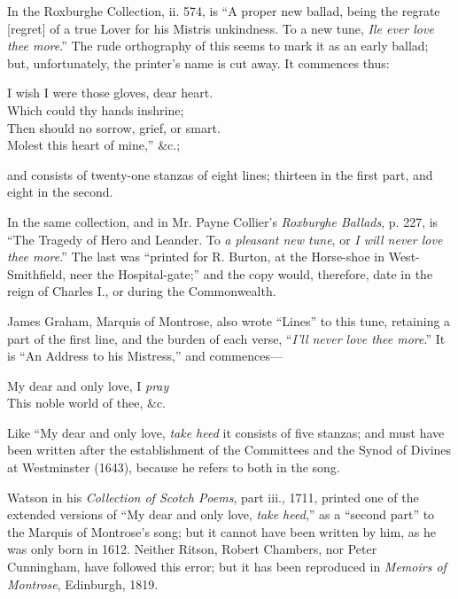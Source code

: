 In the Roxburghe Collection, ii. 574, is “A proper new ballad, being the
regrate [regret] of a true Lover for his Mistris unkindness. To a new tune, \textit{Ile
ever love thee more}.” The rude orthography of this seems to mark it as an early
ballad; but, unfortunately, the printer’s name is cut away. It commences thus:
\settowidth{\versewidth}{Which could thy hands inshrine;}
\begin{dcverse}\begin{altverse}
I wish I were those gloves, dear heart.\\
Which could thy hands inshrine;\\
Then should no sorrow, grief, or smart.\\
Molest this heart of mine,” \&c.;
\end{altverse}
\end{dcverse}
\noindent and consists of twenty-one stanzas of eight lines; thirteen in the first part, and
eight in the second.

In the same collection, and in Mr. Payne Collier’s \textit{Roxburghe Ballads}, p. 227, is
“The Tragedy of Hero and Leander. To \textit{a pleasant new tune}, or \textit{I will never love
thee more}.” The last was “printed for R. Burton, at the Horse-shoe in West-Smithfield,
neer the Hospital-gate;” and the copy would, therefore, date in the
reign of Charles I., or during the Commonwealth.
\pagebreak%

James Graham, Marquis of Montrose, also wrote “Lines” to this tune,
retaining a part of the first line, and the burden of each verse, “\textit{I’ll never love
thee more}.” It is “An Address to his Mistress,” and commences—
\begin{scverse}
\begin{altverse}
My dear and only love, I \textit{pray}\\
This noble world of thee, \&c.
\end{altverse}
\end{scverse}
Like “My dear and only love, \textit{take heed} it consists of five stanzas; and must
have been written after the establishment of the Committees and the Synod of
Divines at Westminster (1643), because he refers to both in the song.

Watson in his \textit{Collection of Scotch Poems}, part iii., 1711, printed one of the
extended versions of “My dear and only love, \textit{take heed},” as a “second part” to
the Marquis of Montrose’s song; but it cannot have been written by him, as he
was only born in 1612. Neither Ritson, Robert Chambers, nor Peter Cunningham,
have followed this error; but it has been reproduced in \textit{Memoirs of Montrose},
Edinburgh, 1819.

